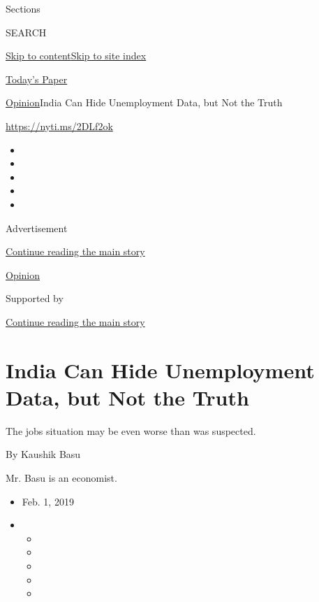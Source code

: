 Sections

SEARCH

\protect\hyperlink{site-content}{Skip to
content}\protect\hyperlink{site-index}{Skip to site index}

\href{https://myaccount.nytimes.com/auth/login?response_type=cookie\&client_id=vi}{}

\href{https://www.nytimes.com/section/todayspaper}{Today's Paper}

\href{/section/opinion}{Opinion}\textbar{}India Can Hide Unemployment
Data, but Not the Truth

\url{https://nyti.ms/2DLf2ok}

\begin{itemize}
\item
\item
\item
\item
\item
\end{itemize}

Advertisement

\protect\hyperlink{after-top}{Continue reading the main story}

\href{/section/opinion}{Opinion}

Supported by

\protect\hyperlink{after-sponsor}{Continue reading the main story}

\hypertarget{india-can-hide-unemployment-data-but-not-the-truth}{%
\section{India Can Hide Unemployment Data, but Not the
Truth}\label{india-can-hide-unemployment-data-but-not-the-truth}}

The jobs situation may be even worse than was suspected.

By Kaushik Basu

Mr. Basu is an economist.

\begin{itemize}
\item
  Feb. 1, 2019
\item
  \begin{itemize}
  \item
  \item
  \item
  \item
  \item
  \end{itemize}
\end{itemize}

